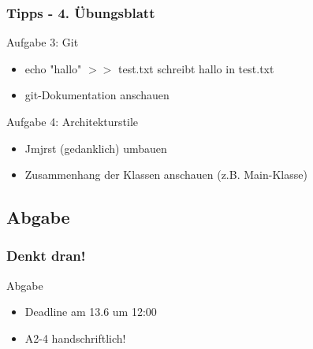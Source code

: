 \documentclass[18pt]{beamer}
\begin{document}
	\begin{frame}
		\frametitle{Tipps - 4. Übungsblatt}
			\begin{exampleblock}{Aufgabe 3: Git}
				\begin{itemize}
					\item echo "hallo" $>>$ test.txt schreibt hallo in test.txt
					\item git-Dokumentation anschauen
				\end{itemize}
			\end{exampleblock}
			
			\pause

			\begin{exampleblock}{Aufgabe 4: Architekturstile}
				\begin{itemize}
					\item Jmjrst (gedanklich) umbauen
					\item Zusammenhang der Klassen anschauen (z.B. Main-Klasse)
				\end{itemize}
			\end{exampleblock}
	\end{frame}
	
	\subsection{Abgabe}
	\begin{frame}
		\frametitle{Denkt dran!}
		\begin{alertblock}{Abgabe}
			\begin{itemize}
				\item Deadline am 13.6 um 12:00
				\item A2-4 handschriftlich!
			\end{itemize}
		\end{alertblock}
	\end{frame}
		
\end{document}
